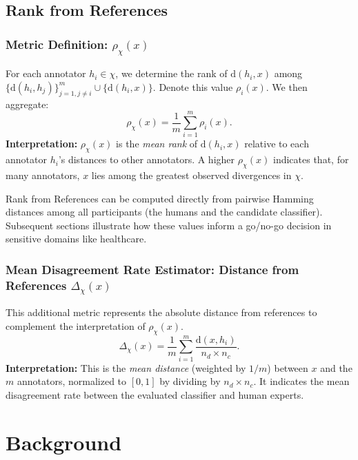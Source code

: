 \documentclass[12pt]{article}
\begin{document}
\subsection{Rank from References}

\subsubsection{Metric Definition: $\rho_{\chi}(x)$}
For each annotator $h_i \in \chi$, we determine the rank of $\mathrm{d}(h_i,x)$ among $\{\mathrm{d}(h_i,h_j)\}_{j=1, j\neq i}^m \cup \{\mathrm{d}(h_i,x)\}$. Denote this value $\rho_i(x)$. We then aggregate:
\begin{equation}
\rho_{\chi}(x) = \frac{1}m\sum_{i=1}^m \rho_i(x).
\end{equation}
\noindent \textbf{Interpretation:} $\rho_{\chi}(x)$ is the \textit{mean rank} of $\mathrm{d}(h_i,x)$ relative to each annotator $h_i$’s distances to other annotators. A higher $\rho_{\chi}(x)$ indicates that, for many annotators, $x$ lies among the greatest observed divergences in $\chi$.

Rank from References can be computed directly from pairwise Hamming distances among all participants (the humans and the candidate classifier). Subsequent sections illustrate how these values inform a go/no-go decision in sensitive domains like healthcare.

\subsubsection{Mean Disagreement Rate Estimator: Distance from References $\Delta_{\chi}(x)$}

This additional metric represents the absolute distance from references to complement the interpretation of $\rho_{\chi}(x)$.
\begin{equation}
\Delta_{\chi}(x) = \frac{1}{m}\sum_{i=1}^{m} \frac{\mathrm{d}(x, h_i)}{\,n_d \times n_c\,}.
\end{equation}
\noindent \textbf{Interpretation:} This is the \textit{mean distance} (weighted by $1/m$) between $x$ and the $m$ annotators, normalized to $[0,1]$ by dividing by $n_d \times n_c$. It indicates the mean disagreement rate between the evaluated classifier and human experts.

\section{Background}
\end{document}
